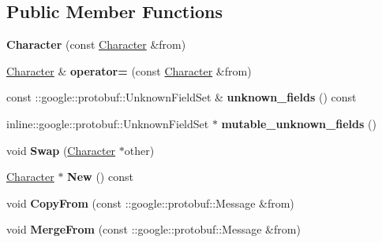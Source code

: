 \subsection*{Public Member Functions}
\begin{DoxyCompactItemize}
\item 
\hypertarget{classproto_1_1_character_a8f5bf8d77951e0ea45b39462a7546cdf}{}{\bfseries Character} (const \hyperlink{classproto_1_1_character}{Character} \&from)\label{classproto_1_1_character_a8f5bf8d77951e0ea45b39462a7546cdf}

\item 
\hypertarget{classproto_1_1_character_ab844330645f962034e76a4d659d83071}{}\hyperlink{classproto_1_1_character}{Character} \& {\bfseries operator=} (const \hyperlink{classproto_1_1_character}{Character} \&from)\label{classproto_1_1_character_ab844330645f962034e76a4d659d83071}

\item 
\hypertarget{classproto_1_1_character_a02f5d040d51c5a49a8dbcb164833fd50}{}const \+::google\+::protobuf\+::\+Unknown\+Field\+Set \& {\bfseries unknown\+\_\+fields} () const \label{classproto_1_1_character_a02f5d040d51c5a49a8dbcb164833fd50}

\item 
\hypertarget{classproto_1_1_character_a11846eb41c8714f5e9b4ee437de7bbca}{}inline\+::google\+::protobuf\+::\+Unknown\+Field\+Set $\ast$ {\bfseries mutable\+\_\+unknown\+\_\+fields} ()\label{classproto_1_1_character_a11846eb41c8714f5e9b4ee437de7bbca}

\item 
\hypertarget{classproto_1_1_character_ae439e522739760c54ef9d65acd53615e}{}void {\bfseries Swap} (\hyperlink{classproto_1_1_character}{Character} $\ast$other)\label{classproto_1_1_character_ae439e522739760c54ef9d65acd53615e}

\item 
\hypertarget{classproto_1_1_character_af1c934cc12cbef7ddcf73bf7197cd3db}{}\hyperlink{classproto_1_1_character}{Character} $\ast$ {\bfseries New} () const \label{classproto_1_1_character_af1c934cc12cbef7ddcf73bf7197cd3db}

\item 
\hypertarget{classproto_1_1_character_aa0496b0a8682360a40607c8f5b092875}{}void {\bfseries Copy\+From} (const \+::google\+::protobuf\+::\+Message \&from)\label{classproto_1_1_character_aa0496b0a8682360a40607c8f5b092875}

\item 
\hypertarget{classproto_1_1_character_a88ccb78cc0e4e17cb9287278cd4f6ed5}{}void {\bfseries Merge\+From} (const \+::google\+::protobuf\+::\+Message \&from)\label{classproto_1_1_character_a88ccb78cc0e4e17cb9287278cd4f6ed5}


\end{DoxyCompactItemize}
